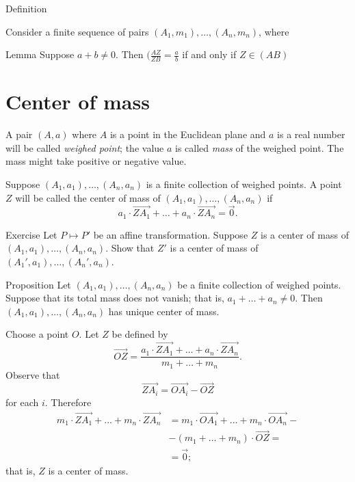\begin{thm}{Definition}

\end{thm}

Consider a finite sequence of pairs $(A_1,m_1),\dots, (A_n,m_n)$, where 




\begin{thm}{Lemma}
Suppose $a+b\ne0$.
Then $(\tfrac{AZ}{ZB}=\tfrac ab$ if and only if $Z\in (AB)$
\end{thm}



\section{Center of mass}

A pair $(A,a)$ where $A$ is a point in the Euclidean plane and $a$ is a real number will be called \emph{weighed point};
the value $a$ is called \emph{mass} of the weighed point.
The mass might take positive or negative value.

Suppose $(A_1,a_1),\dots,(A_n,a_n)$ is a finite collection of weighed points.
A point $Z$ will be called the center of mass of $(A_1,a_1),\dots,(A_n,a_n)$
if 
\[a_1\cdot \overrightarrow{ZA_1}+\dots+a_n\cdot \overrightarrow{ZA_n}=\overrightarrow0.\]

\begin{thm}{Exercise}
Let $P\mapsto P'$ be an affine transformation.
Suppose $Z$ is a center of mass of $(A_1,a_1),\dots,(A_n,a_n)$.
Show that $Z'$ is a center of mass of $(A_1',a_1),\dots,(A_n',a_n)$.
\end{thm}

\begin{thm}{Proposition}
Let $(A_1,a_1),\dots,(A_n,a_n)$ be a finite collection of weighed points.
Suppose that its total mass does not vanish; that is, $a_1+\dots+a_n\ne 0$.
Then $(A_1,a_1),\dots,(A_n,a_n)$ has unique center of mass.
\end{thm}

Choose a point $O$.
Let $Z$ be defined by
\[\overrightarrow{OZ}=\frac{a_1\cdot \overrightarrow{ZA_1}+\dots+a_n\cdot \overrightarrow{ZA_n}}{m_1+\dots+m_n}.\]
Observe that 
\[\overrightarrow{ZA_i}=\overrightarrow{OA_i}-\overrightarrow{OZ}\]
for each $i$.
Therefore 
\begin{align*}
m_1\cdot \overrightarrow{ZA_1}+\dots+m_n\cdot \overrightarrow{ZA_n}
&=
m_1\cdot \overrightarrow{OA_1}+\dots+m_n\cdot \overrightarrow{OA_n}-
\\
&-(m_1+\dots+m_n)\cdot \overrightarrow{OZ}=
\\
&=\overrightarrow0;
\end{align*}
that is, $Z$ is a center of mass.

